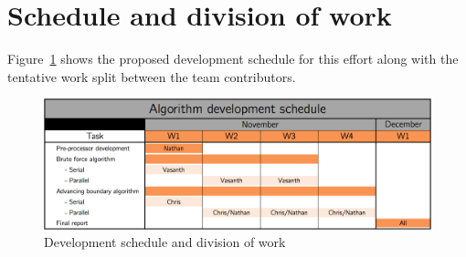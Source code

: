 \documentclass[]{aiaa-tc}%
\begin{document}
\section{Schedule and division of work}
Figure~\ref{f:schedule} shows the proposed development schedule for
this effort along with the tentative work split between the team contributors.

\begin{figure}
  \centering
  \includegraphics[width=0.9\linewidth]{figures/schedule}
  \caption{Development schedule and division of work}
  \label{f:schedule}
\end{figure}

%
%
\end{document}
